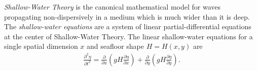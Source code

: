 \documentclass[../main.tex]{subfiles}
\begin{document}
\textit{Shallow-Water Theory} is the canonical mathematical model for waves propagating non-dispersively in a medium which is much wider than it is deep. The \textit{shallow-water equations} are a system of linear partial-differential equations at the center of Shallow-Water Theory. The linear shallow-water equations for a single spatial dimension $x$ and  seafloor shape $H=H(x,y)$ are
\begin{gather}\label{eq:shallow}
    \frac{\partial^2 \eta}{\partial t^2} = \frac{\partial}{\partial x}\left( gH\frac{\partial \eta}{\partial x} \right) + \frac{\partial}{\partial y}\left( gH\frac{\partial \eta}{\partial y} \right).
\end{gather}
\end{document}
